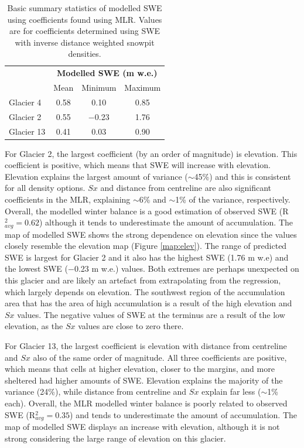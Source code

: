 \documentclass[12pt]{article}
\begin{document}
\begin{table}
\centering
\caption{Basic summary statistics of modelled SWE using coefficients found using MLR. Values are for coefficients determined using SWE with inverse distance weighted snowpit densities. }
\label{tab:MLRsweMinMax}
\begin{tabular}{lccc}
\multicolumn{1}{l}{} & \multicolumn{3}{c}{\textbf{Modelled SWE (m w.e.)}} \\
                     & Mean          & Minimum          & Maximum         \\ \hline
Glacier 4            & 0.58          & 0.10             & 0.85            \\
Glacier 2            & 0.55          & $-$0.23            & 1.76            \\
Glacier 13           & 0.41          & 0.03             & 0.90           
\end{tabular}
\end{table} 

For Glacier 2, the largest coefficient (by an order of magnitude) is elevation. This coefficient is positive, which means that SWE will increase with elevation. Elevation explains the largest amount of variance ($\sim$45\%) and this is consistent for all density options. $Sx$ and distance from centreline are also significant coefficients in the MLR, explaining $\sim$6\% and $\sim$1\% of the variance, respectively.  Overall, the modelled winter balance is a good estimation of observed SWE (R$^2_{avg}=0.62$) although it tends to underestimate the amount of accumulation. The map of modelled SWE shows the strong dependence on elevation since the values closely resemble the elevation map (Figure \ref{map:elev}). The range of predicted SWE is largest for Glacier 2 and it also has the highest SWE (1.76 m w.e) and the lowest SWE ($-$0.23 m w.e.) values. Both extremes are perhaps unexpected on this glacier and are likely an artefact from extrapolating from the regression, which largely depends on elevation. The southwest region of the accumulation area that has the area of high accumulation is a result of the high elevation and $Sx$ values. The negative values of SWE at the terminus are a result of the low elevation, as the $Sx$ values are close to zero there. 

For Glacier 13, the largest coefficient is elevation with distance from centreline and $Sx$ also of the same order of magnitude. All three coefficients are positive, which means that cells at higher elevation, closer to the margins, and more sheltered had higher amounts of SWE. Elevation explains the majority of the variance (24\%), while distance from centreline and $Sx$ explain far less ($\sim$1\% each).  Overall, the MLR modelled winter balance is poorly related to observed SWE (R$^2_{avg}=0.35$) and tends to underestimate the amount of accumulation. The map of modelled SWE displays an increase with elevation, although it is not strong considering the large range of elevation on this glacier.
\end{document}
